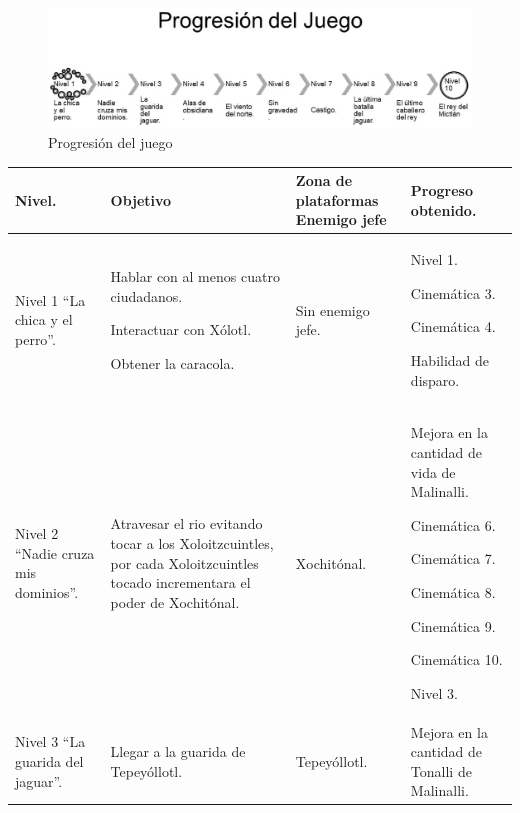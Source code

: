 \begin{figure}
  \centering
   \includegraphics[width=0.8 \textwidth]{05TrabajoRealizado/01DocDiseno02/imagenes/ProgresJuego}
  \caption{Progresión del juego}
  \label{fig:ProgreNiveles}
\end{figure} 

	\begin{longtable}[c]{ | m{3.75cm} | m{3.75cm}| m{3.75cm} | m{3.75cm}|} 
		\rowcolor{cyan} Nivel.& Objetivo & Zona de plataformas	Enemigo jefe & Progreso obtenido. \\ 
		\hline
		Nivel 1 “La chica y el perro”. & 
		Hablar con al menos cuatro ciudadanos.
			\par 
			Interactuar con Xólotl.
			\par 
			Obtener la caracola.&
		Sin enemigo jefe.&
		 Nivel 1.
			\par 
			Cinemática 3.
			\par 
			Cinemática 4.
			\par 
			Habilidad de disparo.		 
		 \\ 
		\hline
		Nivel 2 “Nadie cruza mis dominios”. & 
		Atravesar el rio evitando tocar a los Xoloitzcuintles, por cada Xoloitzcuintles tocado incrementara el poder de Xochitónal. &
		Xochitónal. &
		Mejora en la cantidad de vida de Malinalli.
			\par 
			Cinemática 6.
			\par 
			Cinemática 7.
			\par 
			Cinemática 8.
			\par 
			Cinemática 9.
			\par 
			Cinemática 10.
			\par 
			Nivel 3.		 
		 \\ 
		\hline
		Nivel 3 “La guarida del jaguar”. & 
		Llegar a la guarida de Tepeyóllotl. &
		Tepeyóllotl. &
		Mejora en la cantidad de Tonalli de Malinalli.
			\par 

\end{longtable}
